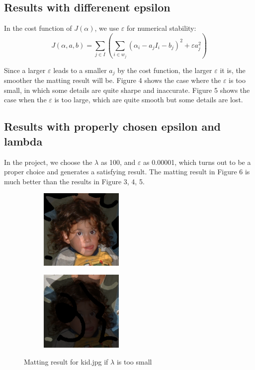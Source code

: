 \documentclass[11pt,letterpaper]{article}
\begin{document}
\subsection{Results with differenent epsilon}

In the cost function of $J(\alpha)$, we use $\varepsilon$ for numerical stability:
$$J(\alpha, a, b) = \sum_{j \in I}(\sum_{i \in w_j}(\alpha_i - a_jI_i-b_j)^2+\varepsilon a_j^2)$$

Since a larger $\varepsilon$ leads to a smaller $a_j$ by the cost function, the larger $\varepsilon$ it is, the smoother the matting result will be. Figure 4 shows the case where the $\varepsilon$ is too small, in which some details are quite sharpe and inaccurate. Figure 5 shows the case when the $\varepsilon$ is too large, which are quite smooth but some details are lost.\\

\subsection{Results with properly chosen epsilon and lambda}
In the project, we choose the $\lambda$ as 100, and $\varepsilon$ as 0.00001, which turns out to be a proper choice and generates a satisfying result. The matting result in Figure 6 is much better than the results in Figure 3, 4, 5.\\

\begin{figure}[h!]
  \centering
  \begin{subfigure}{0.24\textwidth}
    \centering
    \includegraphics[width=4cm]{./result/kid/lambda-F.png}
    \caption{}
  \end{subfigure}
  \begin{subfigure}{0.24\textwidth}
    \centering
    \includegraphics[width=4cm]{./result/kid/lambda-B.png}
    \caption{}
  \end{subfigure}   
  \caption {Matting result for kid.jpg if $\lambda$ is too small}
\end{figure}
\end{document}
